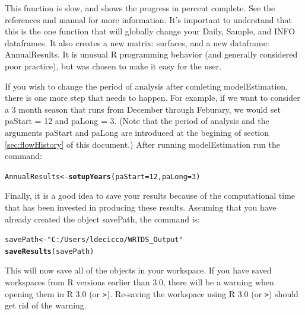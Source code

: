 \documentclass[a4paper,11pt]{article}\usepackage{graphicx, color}
\makeatletter
\newcommand{\hlfunctioncall}[1]{\textcolor[rgb]{0.501960784313725,0,0.329411764705882}{\textbf{#1}}}%
\newcommand{\hlstring}[1]{\textcolor[rgb]{0.6,0.6,1}{#1}}%
\newenvironment{kframe}{%
 \def\at@end@of@kframe{}%
 \ifinner\ifhmode%
  \def\at@end@of@kframe{\end{minipage}}%
  \begin{minipage}{\columnwidth}%
 \fi\fi%
 \def\FrameCommand##1{\hskip\@totalleftmargin \hskip-\fboxsep
 \colorbox{shadecolor}{##1}\hskip-\fboxsep
     \hskip-\linewidth \hskip-\@totalleftmargin \hskip\columnwidth}%
 \MakeFramed {\advance\hsize-\width
   \@totalleftmargin\z@ \linewidth\hsize
   \@setminipage}}%
 {\par\unskip\endMakeFramed%
 \at@end@of@kframe}
\newenvironment{knitrout}{}{} %
\makeatother
\begin{document}
This function is slow, and shows the progress in percent complete. See the references and manual for more information. It's important to understand that this is the one function that will globally change your Daily, Sample, and INFO dataframes. It also creates a new matrix: surfaces, and a new dataframe: AnnualResults. It is unusual R programming behavior (and generally considered poor practice), but was chosen to make it easy for the user.

If you wish to change the period of analysis after comleting modelEstimation, there is one more step that needs to happen.  For example, if we want to consider a 3 month season that runs from December through Feburary, we would set paStart = 12 and paLong = 3.  (Note that the period of analysis and the arguments paStart and paLong are introduced at the begining of section \ref{sec:flowHistory} of this document.) After running modelEstimation run the command:

\begin{knitrout}
\color{fgcolor}\begin{kframe}
\begin{alltt}
AnnualResults<-\hlfunctioncall{setupYears}(paStart=12,paLong=3)
\end{alltt}
\end{kframe}
\end{knitrout}



Finally, it is a good idea to save your results because of the computational time that has been invested in producing these results. Assuming that you have already created the object savePath, the command is:

\begin{knitrout}
\color{fgcolor}\begin{kframe}
\begin{alltt}
savePath <- \hlstring{"C:/Users/ldecicco/WRTDS_Output"}
\hlfunctioncall{saveResults}(savePath) 
\end{alltt}
\end{kframe}
\end{knitrout}


This will now save all of the objects in your workspace. If you have saved workspaces from R versions earlier than 3.0, there will be a warning when opening them in R 3.0 (or \verb|>|). Re-saving the workspace using R 3.0 (or \verb|>|) should get rid of the warning.
\end{document}
